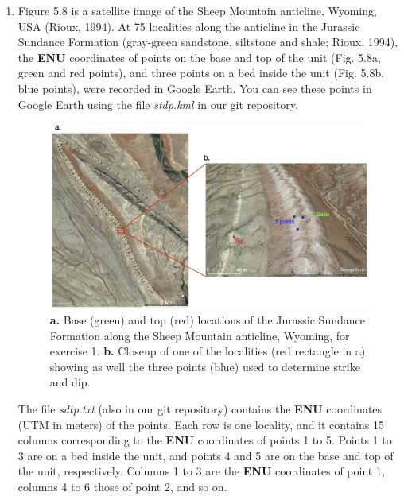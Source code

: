 \documentclass[a4paper , 12pt]{book}
\begin{document}
\begin{enumerate}

    \item Figure 5.8 is a satellite image of the Sheep Mountain anticline, Wyoming, USA (Rioux, 1994). At 75 localities along the anticline in the Jurassic Sundance Formation (gray-green sandstone, siltstone and shale; Rioux, 1994), the \textbf{ENU} coordinates of points on the base and top of the unit (Fig. 5.8a, green and red points), and three points on a bed inside the unit (Fig. 5.8b, blue points), were recorded in Google Earth. You can see these points in Google Earth using the file \textit{stdp.kml} in our git repository. 
    
    \begin{figure}[H]
    \centering
    \includegraphics[width=14cm]{Figures/ch5f13.jpg}
    \caption{\textbf{a.} Base (green) and top (red) locations of the Jurassic Sundance Formation along the Sheep Mountain anticline, Wyoming, for exercise 1. \textbf{b.} Closeup of one of the localities (red rectangle in a) showing as well the three points (blue) used to determine strike and dip.}
    \end{figure}
    
    The file \textit{sdtp.txt} (also in our git repository) contains the \textbf{ENU} coordinates (UTM in meters) of the points. Each row is one locality, and it contains 15 columns corresponding to the \textbf{ENU} coordinates of points 1 to 5. Points 1 to 3 are on a bed inside the unit, and points 4 and 5 are on the base and top of the unit, respectively. Columns 1 to 3 are the \textbf{ENU} coordinates of point 1, columns 4 to 6 those of point 2, and so on. 
    

\end{enumerate}
\end{document}
